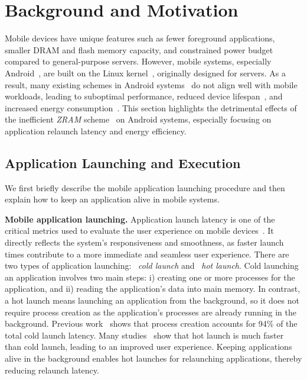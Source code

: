 \section{Background and Motivation}
\label{sec:back}
Mobile devices have unique features such as fewer foreground applications, smaller DRAM and flash memory capacity, and constrained power budget compared to general-purpose servers. However, mobile systems, especially Android~\cite{Android}, are built on the Linux kernel~\cite{Linuxkernel}, originally designed for servers. As a result, many existing schemes in Android systems~\cite{liang2020acclaim, TC, son2021asap, lebeck2020end} do not align well with mobile workloads, leading to suboptimal performance, reduced device lifespan~\cite{liang2022cachesifter, liu2017non, zhu2017smartswap, guo2015mars}, and increased energy consumption~\cite{googleworkloads}. This section highlights the detrimental effects of the inefficient  \emph{ZRAM} scheme~\cite{zram1,zram2} on Android systems, especially focusing on application relaunch latency and energy efficiency.

\subsection{Application Launching and Execution}
We first briefly describe the mobile application launching procedure and then explain how to keep an application alive in mobile systems.

\noindent\textbf{Mobile application launching.}
Application launch latency is one of the critical metrics used to evaluate the user experience on mobile devices~\cite{predict1,predict2,predict3, context-aware, son2021asap}. It directly reflects the system's responsiveness and smoothness, as faster launch times contribute to a more immediate and seamless user experience. There are two types of application launching: ~\textit{cold launch} and ~\textit{hot launch}.
Cold launching an application involves two main steps: i) creating one or more processes for the application, and ii) reading the application's data into main memory. In contrast, a hot launch means launching an application from the background, so it does not require process creation as the application's processes are already running in the background. Previous work~\cite{liu2017non} shows that process creation accounts for 94\% of the total cold launch latency. Many studies~\cite{lebeck2020end, son2021asap, end2024more} show that hot launch is much faster than cold launch, leading to an improved user experience. Keeping applications alive in the background enables hot launches for relaunching applications, thereby reducing relaunch latency.


